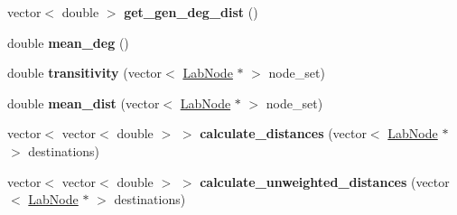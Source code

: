 \begin{DoxyCompactItemize}
\item 
\hypertarget{classelps_1_1_lab_network_a993fee842b6ae21cec8bcf9b0579677b}{vector$<$ double $>$ {\bfseries get\-\_\-gen\-\_\-deg\-\_\-dist} ()}\label{classelps_1_1_lab_network_a993fee842b6ae21cec8bcf9b0579677b}

\item 
\hypertarget{classelps_1_1_lab_network_a881f92e6cd40429915f9980bfbe0b2a4}{double {\bfseries mean\-\_\-deg} ()}\label{classelps_1_1_lab_network_a881f92e6cd40429915f9980bfbe0b2a4}

\item 
\hypertarget{classelps_1_1_lab_network_ae21592036aec8bc96cd424e93a45d4bd}{double {\bfseries transitivity} (vector$<$ \hyperlink{classelps_1_1_lab_node}{Lab\-Node} $\ast$ $>$ node\-\_\-set)}\label{classelps_1_1_lab_network_ae21592036aec8bc96cd424e93a45d4bd}

\item 
\hypertarget{classelps_1_1_lab_network_aa0e33c933e5091abba1b27817876487a}{double {\bfseries mean\-\_\-dist} (vector$<$ \hyperlink{classelps_1_1_lab_node}{Lab\-Node} $\ast$ $>$ node\-\_\-set)}\label{classelps_1_1_lab_network_aa0e33c933e5091abba1b27817876487a}

\item 
\hypertarget{classelps_1_1_lab_network_a046a283aee68ce0d20087a706794a5c6}{vector$<$ vector$<$ double $>$ $>$ {\bfseries calculate\-\_\-distances} (vector$<$ \hyperlink{classelps_1_1_lab_node}{Lab\-Node} $\ast$ $>$ destinations)}\label{classelps_1_1_lab_network_a046a283aee68ce0d20087a706794a5c6}

\item 
\hypertarget{classelps_1_1_lab_network_aa9abbf4211e6dd789da2f84107dbb9f8}{vector$<$ vector$<$ double $>$ $>$ {\bfseries calculate\-\_\-unweighted\-\_\-distances} (vector$<$ \hyperlink{classelps_1_1_lab_node}{Lab\-Node} $\ast$ $>$ destinations)}\label{classelps_1_1_lab_network_aa9abbf4211e6dd789da2f84107dbb9f8}


\end{DoxyCompactItemize}
